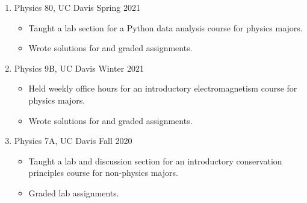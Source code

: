 \documentclass[11pt,letterpaper]{article}
\begin{document}
\begin{enumerate}
  \item Physics 80, UC Davis \hfill Spring 2021
        \begin{itemize}
          \item Taught a lab section for a Python data analysis course for physics
                majors.
          \item Wrote solutions for and graded assignments.
        \end{itemize}

  \item Physics 9B, UC Davis \hfill Winter 2021
        \begin{itemize}
          \item Held weekly office hours for an introductory electromagnetism course for
                physics majors.
          \item Wrote solutions for and graded assignments.
        \end{itemize}

  \item Physics 7A, UC Davis \hfill Fall 2020
        \begin{itemize}
          \item Taught a lab and discussion section for an introductory conservation
                principles course for non-physics majors.
          \item Graded lab assignments.
        \end{itemize}
\end{enumerate}
\end{document}
